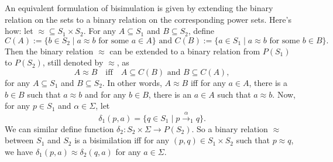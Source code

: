 \documentclass[12pt]{article}
\begin{document}
An equivalent formulation of bisimulation is given by extending the binary relation on the sets to a binary relation on the corresponding power sets.  Here's how: let $\approx \subseteq S_1\times S_2$.  For any $A\subseteq S_1$ and $B\subseteq S_2$, define
$$C(A):=\lbrace b\in S_2 \mid a \approx b \mbox{ for some } a\in A\rbrace \mbox{ and } C(B):=\lbrace a\in S_1 \mid a \approx b \mbox{ for some } b\in B\rbrace.$$
Then the binary relation $\approx$ can be extended to a binary relation from $P(S_1)$ to $P(S_2)$, still denoted by $\approx$, as
$$A\approx B \quad \textrm{iff} \quad A\subseteq C(B)\textrm{ and }B\subseteq C(A),$$
for any $A\subseteq S_1$ and $B\subseteq S_2$.  In other words, $A\approx B$ iff for any $a\in A$, there is a $b\in B$ such that $a\approx b$ and for any $b\in B$, there is an $a\in A$ such that $a\approx b$.  Now, for any $p\in S_1$ and $\alpha \in \Sigma$, let $$\delta_1(p,a)=\lbrace q \in S_1\mid p\stackrel{\alpha}{\rightarrow}_1 q\rbrace.$$  We can similar define function $\delta_2: S_2\times \Sigma \to P(S_2)$.  So a binary relation $\approx$ between $S_1$ and $S_2$ is a bisimilation iff for any $(p,q)\in S_1\times S_2$ such that $p\approx q$, we have $\delta_1(p,a) \approx \delta_2(q,a)$ for any $a\in \Sigma$.
\end{document}
